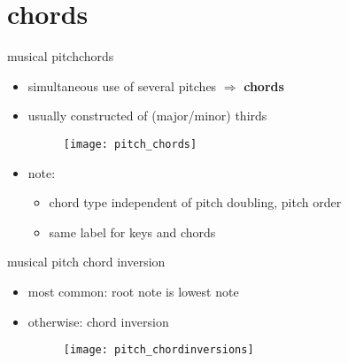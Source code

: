         
    \section{chords}
        \begin{frame}{musical pitch}{chords}
            \begin{itemize}
                \item	simultaneous use of several pitches $\Rightarrow$ \textbf{chords}
                \item	usually constructed of (major/minor) thirds
                \begin{figure}[t]
                    \centering
                    \texttt{[image: pitch\_chords]}
                \end{figure}
                
                \smallskip
                \item<2->	note:
                        \begin{itemize}
                            \item	chord type independent of pitch doubling, pitch order
                            \item	same label for keys and chords
                        \end{itemize}
            \end{itemize}
        \end{frame}
        
        \begin{frame}{musical pitch}{ chord inversion}
            \begin{itemize}
                \item	most common: root note is lowest note
                \item	otherwise: chord inversion
                \begin{figure}[t]
                    \centering
                    \texttt{[image: pitch\_chordinversions]}
                \end{figure}
                
            \end{itemize}
        \end{frame}
        
